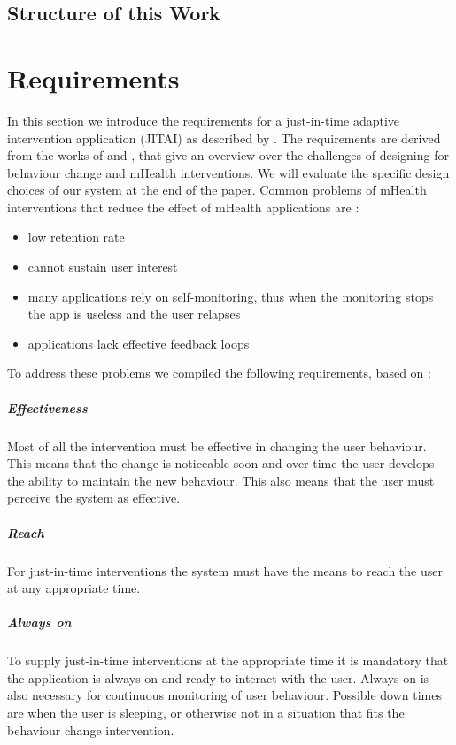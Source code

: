 \documentclass[a4paper]{report}
\begin{document}
\section{Structure of this Work}


\chapter{Requirements}\label{requirements}
In this section we introduce the requirements for a just-in-time adaptive intervention application (JITAI) as described by \cite{spruijt2014dynamic}. The requirements are derived from the works of \cite{wendel2013} and \cite{Poole2013}, that give an overview over the challenges of designing for behaviour change and mHealth interventions. We will evaluate the specific design choices of our system at the end of the paper.
Common problems of mHealth interventions that reduce the effect of mHealth applications are \parencite{Poole2013}: 
\begin{itemize}
  \item low retention rate
  \item cannot sustain user interest
  \item many applications rely on self-monitoring, thus when the monitoring stops the app is useless and the user relapses
  \item applications lack effective feedback loops
\end{itemize}
To address these problems we compiled the following requirements, based on \cite{wendel2013}:
\paragraph{Effectiveness} Most of all the intervention must be effective in changing the user behaviour. This means that the change is noticeable soon and over time the user develops the ability to maintain the new behaviour. This also means that the user must perceive the system as effective.
\paragraph{Reach} For just-in-time interventions the system must have the means to reach the user at any appropriate time. 
\paragraph{Always on} To supply just-in-time interventions at the appropriate time it is mandatory that the application is always-on and ready to interact with the user. Always-on is also necessary for continuous monitoring of user behaviour. Possible down times are when the user is sleeping, or otherwise not in a situation that fits the behaviour change intervention.
\end{document}
